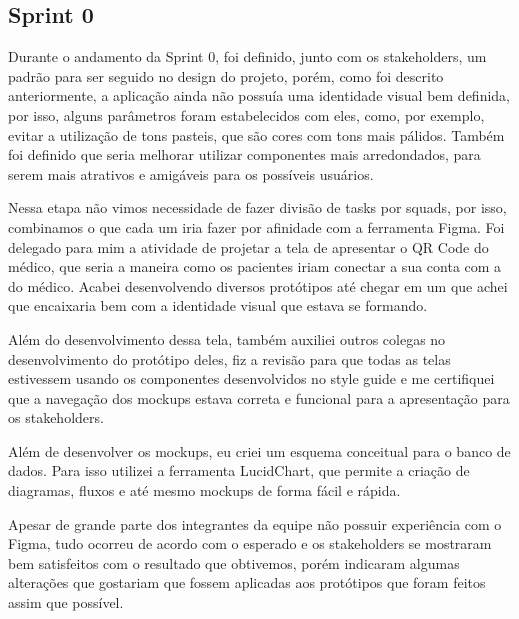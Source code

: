 \subsection{Sprint 0}

Durante o andamento da Sprint 0, foi definido, junto com os stakeholders, um 
padrão para ser seguido no design do projeto, porém, como foi descrito anteriormente, 
a aplicação ainda não possuía uma identidade visual bem definida, por isso, alguns 
parâmetros foram estabelecidos com eles, como, por exemplo, evitar a utilização de tons pasteis, que são cores com tons mais pálidos. Também foi definido que seria 
melhorar utilizar componentes mais arredondados, para serem mais atrativos e amigáveis para os possíveis usuários.

Nessa etapa não vimos necessidade de fazer divisão de tasks por squads, por isso, combinamos o que cada um iria fazer por afinidade com a ferramenta Figma\cite{figma}. Foi delegado para mim a atividade de projetar a tela de apresentar o QR Code do médico, que seria a maneira como os pacientes iriam conectar a sua conta com a do médico. Acabei desenvolvendo diversos protótipos até chegar em um que achei que encaixaria bem com a identidade visual que estava se formando.

Além do desenvolvimento dessa tela, também auxiliei outros colegas no desenvolvimento do 
protótipo deles, fiz a revisão para que todas as telas estivessem usando os 
componentes desenvolvidos no style guide e me certifiquei que a navegação dos 
mockups estava correta e funcional para a apresentação para os stakeholders.

Além de desenvolver os mockups, eu criei um esquema conceitual para o 
banco de dados. Para isso utilizei a ferramenta LucidChart\cite{lucidchart}, que permite a criação de diagramas, fluxos e até mesmo mockups de forma fácil e rápida.

Apesar de grande parte dos integrantes da equipe não possuir experiência com 
o Figma\cite{figma}, tudo ocorreu de acordo com o esperado e os stakeholders se mostraram 
bem satisfeitos com o resultado que obtivemos, porém indicaram algumas alterações 
que gostariam que fossem aplicadas aos protótipos que foram feitos assim que 
possível.
